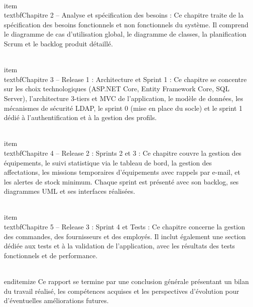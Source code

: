 \\item \\textbf{Chapitre 2 -- Analyse et spécification des besoins :} Ce chapitre traite de la spécification des besoins fonctionnels et non fonctionnels du système. Il comprend le diagramme de cas d'utilisation global, le diagramme de classes, la planification Scrum et le backlog produit détaillé.

\\item \\textbf{Chapitre 3 -- Release 1 : Architecture et Sprint 1 :} Ce chapitre se concentre sur les choix technologiques (ASP.NET Core, Entity Framework Core, SQL Server), l'architecture 3-tiers et MVC de l'application, le modèle de données, les mécanismes de sécurité LDAP, le sprint 0 (mise en place du socle) et le sprint 1 dédié à l'authentification et à la gestion des profils.

\\item \\textbf{Chapitre 4 -- Release 2 : Sprints 2 et 3 :} Ce chapitre couvre la gestion des équipements, le suivi statistique via le tableau de bord, la gestion des affectations, les missions temporaires d'équipements avec rappels par e-mail, et les alertes de stock minimum. Chaque sprint est présenté avec son backlog, ses diagrammes UML et ses interfaces réalisées.

\\item \\textbf{Chapitre 5 -- Release 3 : Sprint 4 et Tests :} Ce chapitre concerne la gestion des commandes, des fournisseurs et des employés. Il inclut également une section dédiée aux tests et à la validation de l'application, avec les résultats des tests fonctionnels et de performance.
 
\\end{itemize}
Ce rapport se termine par une conclusion générale présentant un bilan du travail réalisé, les compétences acquises et les perspectives d'évolution pour d'éventuelles améliorations futures.



